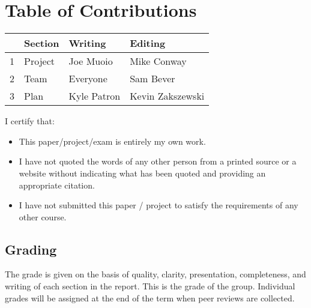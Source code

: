 \documentclass{article}
\begin{document}
\section*{\centering Table of Contributions}
\begin{tabular}{| l | l | l | l |}
    \hline
     & Section & Writing & Editing \\
    \hline \hline
    1 & Project & Joe Muoio  & Mike Conway \\ \hline
    2 & Team & Everyone & Sam Bever \\ \hline
    3 & Plan & Kyle Patron & Kevin Zakszewski \\ \hline
\end{tabular}
\newpage
\noindent I certify that:
\begin{itemize}
\item This paper/project/exam is entirely my own work.
\item I have not quoted the words of any other person from a printed source or a website without indicating what has been quoted and providing an appropriate citation.
\item I have not submitted this paper / project to satisfy the requirements of any other course.
\end{itemize}

\vspace{1cm}
\noindent{}


\vspace{0.5cm}
\noindent{}

\vspace{0.5cm}
\noindent{}

\vspace{0.5cm}
\noindent{}

\vspace{0.5cm}
\noindent{}

\vspace{\fill}
\subsection*{Grading}
The grade is given on the basis of quality, clarity, presentation, completeness, and writing of each section in the report. This is the grade of the group. Individual grades will be assigned at the end of the term when peer reviews are collected.
\end{document}
